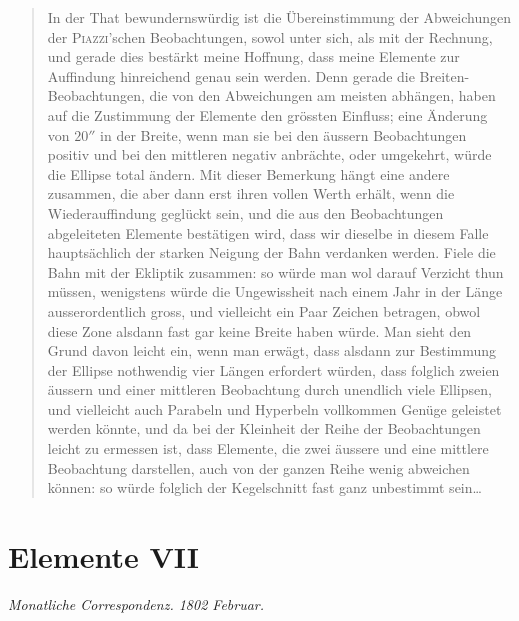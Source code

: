 \documentclass[11pt,a4paper]{book}
\begin{document}
\begin{quotation}
\glqq In der That bewundernswürdig ist die Übereinstimmung der Abweichungen der \textsc{Piazzi}'schen Beobachtungen, sowol unter sich, als mit der Rechnung, und gerade dies bestärkt meine Hoffnung, dass meine Elemente zur Auffindung hinreichend genau sein werden. Denn gerade die Breiten-Beobachtungen, die von den Abweichungen am meisten abhängen, haben auf die Zustimmung der Elemente den grössten Einfluss; eine Änderung von $20''$ in der Breite, wenn man sie bei den äussern Beobachtungen positiv und bei den mittleren negativ anbrächte, oder umgekehrt, würde die Ellipse total ändern. Mit dieser Bemerkung hängt eine andere zusammen, die aber dann erst ihren vollen Werth erhält, wenn die Wiederauffindung geglückt sein, und die aus den Beobachtungen abgeleiteten Elemente bestätigen wird, dass wir dieselbe in diesem Falle hauptsächlich der starken Neigung der Bahn verdanken werden. Fiele die Bahn mit der Ekliptik zusammen: so würde man wol darauf Verzicht thun müssen, wenigstens würde die Ungewissheit nach einem Jahr in der Länge ausserordentlich gross, und vielleicht ein Paar Zeichen betragen, obwol diese Zone alsdann fast gar keine Breite haben würde. Man sieht den Grund davon leicht ein, wenn man erwägt, dass alsdann zur Bestimmung der Ellipse nothwendig vier Längen erfordert würden, dass folglich zweien äussern und einer mittleren Beobachtung durch unendlich viele Ellipsen, und vielleicht auch Parabeln und Hyperbeln vollkommen Genüge geleistet werden könnte, und da bei der Kleinheit der Reihe der Beobachtungen leicht zu ermessen ist, dass Elemente, die zwei äussere und eine mittlere Beobachtung darstellen, auch von der ganzen Reihe wenig abweichen können: so würde folglich der Kegelschnitt fast ganz unbestimmt sein\ldots\grqq
\end{quotation}

\section*{Elemente VII}

\begin{center}
\textit{Monatliche Correspondenz. 1802 Februar.}
\end{center}
\end{document}
